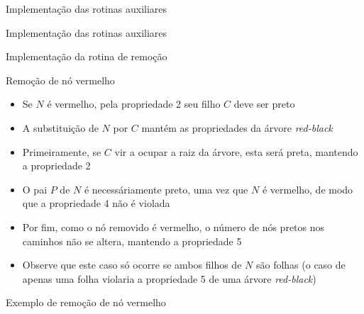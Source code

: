 \begin{frame}[fragile]{Implementação das rotinas auxiliares}
\end{frame}

\begin{frame}[fragile]{Implementação das rotinas auxiliares}
\end{frame}

\begin{frame}[fragile]{Implementação da rotina de remoção}
\end{frame}

\begin{frame}[fragile]{Remoção de nó vermelho}

    \begin{itemize}
        \item Se $N$ é vermelho, pela propriedade 2 seu filho $C$ deve ser preto

        \item A substituição de $N$ por $C$ mantém as propriedades da
            árvore \textit{red-black}

        \item Primeiramente, se $C$ vir a ocupar a raiz da árvore, esta será preta, mantendo
            a propriedade 2

        \item O pai $P$ de $N$ é necessáriamente preto, uma vez que $N$ é vermelho, de modo que
            a propriedade 4 não é violada

        \item Por fim, como o nó removido é vermelho, o número de nós pretos nos caminhos não
            se altera, mantendo a propriedade 5

        \item Observe que este caso só ocorre se ambos filhos de $N$ são folhas (o caso de apenas
            uma folha violaria a propriedade 5 de uma árvore \textit{red-black})

    \end{itemize}

\end{frame}

\begin{frame}[fragile]{Exemplo de remoção de nó vermelho}


\end{frame}

